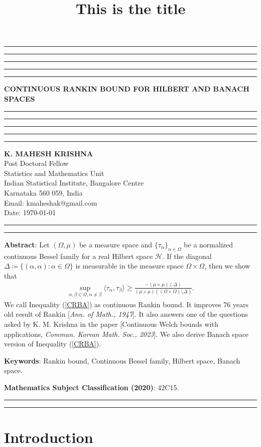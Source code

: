 \documentclass{amsart}
\title{This is the title}
\begin{document}
\hrule\hrule\hrule\hrule\hrule
\vspace{0.3cm}	
\begin{center}
{\bf{CONTINUOUS RANKIN BOUND FOR HILBERT AND BANACH SPACES}}\\
\vspace{0.3cm}
\hrule\hrule\hrule\hrule\hrule
\vspace{0.3cm}
\textbf{K. MAHESH KRISHNA}\\
Post Doctoral Fellow \\
Statistics and Mathematics Unit\\
Indian Statistical Institute, Bangalore Centre\\
Karnataka 560 059, India\\
Email:  kmaheshak@gmail.com\\

Date: \today
\end{center}

\hrule\hrule
\vspace{0.5cm}
\textbf{Abstract}:  Let $(\Omega, \mu)$ be a  measure space and $\{\tau_\alpha\}_{\alpha\in \Omega}$ be a 	normalized continuous Bessel  family for a real Hilbert  space $\mathcal{H}$.  If the diagonal $\Delta\coloneqq \{(\alpha, \alpha):\alpha \in \Omega\}$ is measurable in the measure space $\Omega\times \Omega$, then we show that 
\begin{align}\label{CRBA}
	\sup _{\alpha, \beta \in \Omega, \alpha\neq \beta}\langle \tau_\alpha, \tau_\beta\rangle \geq \frac{-(\mu\times\mu)(\Delta)}{(\mu\times\mu)((\Omega\times\Omega)\setminus\Delta)}.
\end{align}
We call Inequality (\ref{CRBA}) as continuous Rankin bound. It improves 76 years old result of Rankin [\textit{Ann. of Math.,  1947}].  It also answers one of the questions asked by K. M. Krishna in the paper [Continuous Welch bounds with applications, \textit{Commun. Korean Math. Soc., 2023}]. We also derive Banach space version of Inequality (\ref{CRBA}).

\textbf{Keywords}:    Rankin bound, Continuous Bessel family, Hilbert space, Banach space.

\textbf{Mathematics Subject Classification (2020)}: 42C15.\\

\hrule

\hrule
\section{Introduction}
\end{document}
